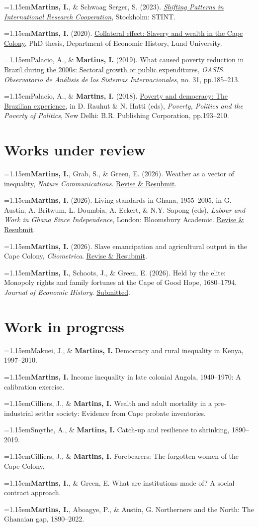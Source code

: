 \documentclass[11pt,a4paper]{article}
\newcommand{\cvlistitem}[1]{\par\addvspace{5pt}\noindent
  \textcolor{accent}{\raisebox{.45ex}{\rule{3.2pt}{3.2pt}}}\hspace{7pt}%
  \begin{minipage}[t]{\dimexpr\linewidth-12pt\relax}\hangindent=1.15em\hangafter=1\relax #1\par\end{minipage}\par}
\let\originalsection\section
\renewcommand{\section}[1]{\par\Needspace{110pt}\originalsection{#1}}
\begin{document}
\smallskip
\cvlistitem{\textbf{Martins, I.}, \& Schwaag Serger, S. (2023). \href{https://www.stint.se/wp-content/uploads/2023/07/STINT\_Shifting-patterns-1.pdf}{\textit{Shifting Patterns in International Research Cooperation}}, Stockholm: STINT.}
\smallskip
\cvlistitem{\textbf{Martins, I.} (2020). \href{https://portal.research.lu.se/en/publications/collateral-effect-slavery-and-wealth-in-the-cape-colony}{Collateral effect: Slavery and wealth in the Cape Colony}, PhD thesis, Department of Economic History, Lund University.}
\smallskip
\cvlistitem{Palacio, A., \& \textbf{Martins, I.} (2019). \href{https://doi.org/10.18601/16577558.n31.11}{What caused poverty reduction in Brazil during the 2000s: Sectoral growth or public expenditures}, \textit{OASIS. Observatorio de Análisis de los Sistemas Internacionales}, no. 31, pp.185--213.}
\smallskip
\cvlistitem{Palacio, A., \& \textbf{Martins, I.} (2018). \href{https://www.amazon.com/Poverty-Politics/dp/9387587126}{Poverty and democracy: The Brazilian experience}, in D. Rauhut \& N. Hatti (eds), \textit{Poverty, Politics and the Poverty of Politics}, New Delhi: B.R. Publishing Corporation, pp.193--210.}


\section{Works under review}
\cvlistitem{\textbf{Martins, I.}, Grab, S., \& Green, E. (2026). Weather as a vector of inequality, \textit{Nature Communications}. \underline{Revise \& Resubmit}.}
\smallskip
\cvlistitem{\textbf{Martins, I.} (2026). Living standards in Ghana, 1955--2005, in G. Austin, A. Britwum, L. Doumbia, A. Eckert, \& N.Y. Sapong (eds), \textit{Labour and Work in Ghana Since Independence}, London: Bloomsbury Academic. \underline{Revise \& Resubmit}.}
\smallskip
\cvlistitem{\textbf{Martins, I.} (2026). Slave emancipation and agricultural output in the Cape Colony, \textit{Cliometrica}. \underline{Revise \& Resubmit}.}
\smallskip
\cvlistitem{\textbf{Martins, I.}, Schoots, J., \& Green, E. (2026). Held by the elite: Monopoly rights and family fortunes at the Cape of Good Hope, 1680--1794, \textit{Journal of Economic History}. \underline{Submitted}.}


\section{Work in progress}
\cvlistitem{Makuei, J., \& \textbf{Martins, I.} Democracy and rural inequality in Kenya, 1997--2010.}
\smallskip
\cvlistitem{\textbf{Martins, I.} Income inequality in late colonial Angola, 1940--1970: A calibration exercise.}
\smallskip
\cvlistitem{Cilliers, J., \& \textbf{Martins, I.} Wealth and adult mortality in a pre-industrial settler society: Evidence from Cape probate inventories.}
\smallskip
\cvlistitem{Smythe, A., \& \textbf{Martins, I.} Catch-up and resilience to shrinking, 1890--2019.}
\smallskip
\cvlistitem{Cilliers, J., \& \textbf{Martins, I.} Forebearers: The forgotten women of the Cape Colony.}
\smallskip
\cvlistitem{\textbf{Martins, I.}, \& Green, E. What are institutions made of? A social contract approach.}
\smallskip
\cvlistitem{\textbf{Martins, I.}, Aboagye, P., \& Austin, G. Northerners and the North: The Ghanaian gap, 1890--2022.}
\end{document}
